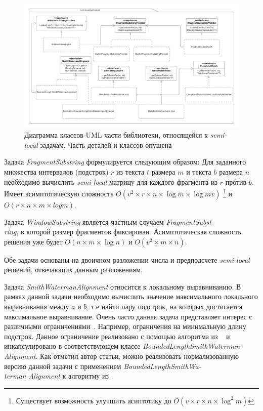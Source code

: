 \begin{figure}
    \includegraphics[width=\columnwidth]{figures/semiLocalApplication.png}
    \caption{Диаграмма классов UML части библиотеки, относящейся к \emph{semi-local} задачам. Часть деталей и классов опущена}\label{fig:libraryApplication}
\end{figure}


Задача \emph{FragmentSubstring} формулируется следующим образом: Для заданного множества интервалов (подстрок) $r$ из текста $t$ размера $m$ и текста $b$ размера $n$ необходимо вычислить \emph{semi-local} матрицу для каждого фрагмента из $r$ против $b$.
Имеет асимптотическую сложность $O(v^2 \times r \times  n \times \log m \times \log mv)$ \footnote{Существует возможность улучшить асиптотику до $O(v \times r \times  n \times \log^{2} m)$ } и $O(r \times n \times m  \times  log m)$.

Задача \emph{WindowSubstring}  является частным случаем   \emph{FragmentSubst-\\ring}, в которой размер фрагментов фиксирован.
Асимптотическая сложность решения уже будет $O(n \times m \times \log n)$ и $O(v^2 \times  m \times n)$.

Обе задачи основаны на двоичном разложении числа и предподсчете \emph{semi-local} решений, отвечающих данным разложениям.

Задача \emph{SmithWatermanAlignment} относится к локальному выравниванию.
В рамках данной задачи необходимо вычислить значение максимального локального выравнивания между $a$ и $b$, т.е найти пару подстрок, на которых достигается максимальное выравнивание.
Очень часто данная задача представляет интерес с различными ограничениями~\cite{arslan2004dynamic}.
Например, ограничения на минимальную длину подстрок.
Данное ограничение реализовано с помощью алгоритма из ~\cite{tiskin2019bounded} и инкапсулировано в соответствующем классе  \emph{BoundedLengthSmithWaterman-\\Alignment}.
Как отметил автор статьи, можно реализовать нормализованную версию данной задачи с применением \emph{BoundedLengthSmithWa-\\terman Alignment} к алгоритму из \cite{arslan2004dynamic}.

